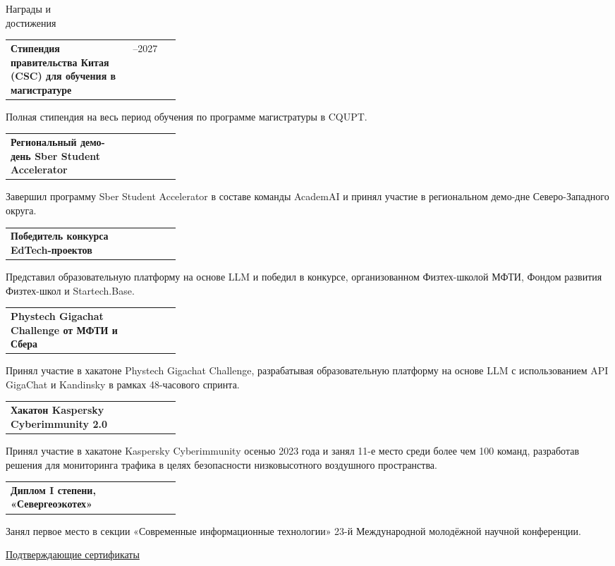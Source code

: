 \documentclass[11pt,a4paper]{article}
\makeatletter
\newcommand{\cvrow}[2]{%
  \noindent
  \begin{minipage}[t]{0.145\textwidth}
    \vspace{0pt}%
    \raggedright
    \fontsize{10.5}{12.5}\selectfont
    #1
  \end{minipage}%
  \hfill
  \begin{minipage}[t]{0.835\textwidth}
    \vspace{0pt}%
    #2
  \end{minipage}\par
}
\newcommand{\entry}[2]{%
  \begin{tabularx}{\linewidth}{@{}X >{\raggedleft\arraybackslash}p{0.28\linewidth}@{}}
    #1 & #2
  \end{tabularx}
}
\makeatother
\begin{document}
\cvrow{Награды и\\достижения}{%
  \entry
    {\textbf{Стипендия правительства Китая (CSC) для обучения в магистратуре}}
    {2024--2027}
  Полная стипендия на весь период обучения по программе магистратуры в CQUPT.

  \vspace{0.45em}
  \entry
    {\textbf{Региональный демо-день Sber Student Accelerator}}
    {2023}
  Завершил программу Sber Student Accelerator в составе команды AcademAI
  и принял участие в региональном демо-дне Северо-Западного округа.

  \vspace{0.45em}
  \entry
    {\textbf{Победитель конкурса EdTech-проектов}}
    {2023}
  Представил образовательную платформу на основе LLM и победил в конкурсе,
  организованном Физтех-школой МФТИ, Фондом развития Физтех-школ
  и Startech.Base.

  \vspace{0.45em}
  \entry
    {\textbf{Phystech Gigachat Challenge от МФТИ и Сбера}}
    {2023}
  Принял участие в хакатоне Phystech Gigachat Challenge, разрабатывая
  образовательную платформу на основе LLM с использованием API GigaChat
  и Kandinsky в рамках 48-часового спринта.

  \vspace{0.45em}
  \entry{\textbf{Хакатон Kaspersky Cyberimmunity 2.0}}
  {2023}
  Принял участие в хакатоне Kaspersky Cyberimmunity осенью 2023 года
  и занял 11-е место среди более чем 100 команд, разработав решения
  для мониторинга трафика в целях безопасности низковысотного воздушного пространства.

  \vspace{0.45em}
  \entry
    {\textbf{Диплом I степени, «Севергеоэкотех»}}
    {2022}
  Занял первое место в секции «Современные информационные технологии»
  23-й Международной молодёжной научной конференции.

  \vspace{0.3em}
  \href{https://iasenovets.github.io/files/certificates_selected_en_public_ready_v2.pdf}
       {\small Подтверждающие сертификаты}
}
\end{document}
